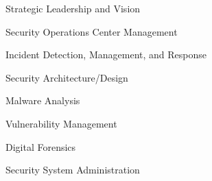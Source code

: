 \begin{multicols}{2}
\begin{zitemize}
\item Strategic Leadership and Vision

\item Security Operations Center Management

\item Incident Detection, Management, and Response

\item Security Architecture/Design

\columnbreak
\item Malware Analysis
\item Vulnerability Management 
\item Digital Forensics
\item Security System Administration
\end{zitemize} 
\end{multicols}